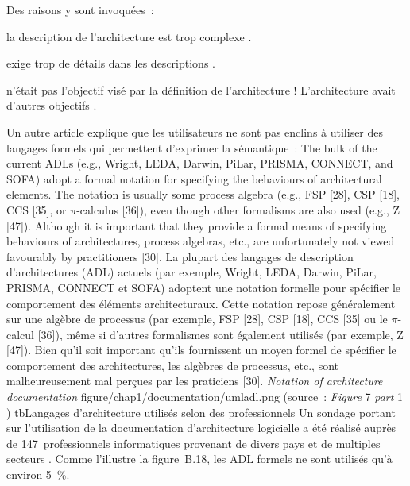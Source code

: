 {Des raisons y sont invoquées~:
 {
    \item[][---] \elide la description de l'architecture est trop complexe \elide.
    \item[][---]  exige trop de détails dans les descriptions \elide.
    \item[][---]  n'était pas l'objectif visé par la définition de l'architecture ! L'architecture avait d'autres objectifs \elide.
}{\cite{malavolta_what_2013}}

Un autre article explique que les utilisateurs ne sont pas enclins à utiliser des langages formels qui permettent d'exprimer la sémantique~:
\quoteenfr
{The bulk of the current ADLs (e.g., Wright, LEDA, Darwin, PiLar, PRISMA, CONNECT, and SOFA) adopt a formal notation for specifying the behaviours of architectural elements. The notation is usually some process algebra (e.g.,  FSP [28], CSP [18], CCS [35], or $\pi$-calculus [36]), even though other formalisms are also used (e.g., Z [47]). Although it is important that they provide a formal means of specifying behaviours of architectures, process algebras, etc., are unfortunately not viewed favourably by practitioners [30].}
{La plupart des langages de description d'architectures (ADL) actuels (par exemple, Wright, LEDA, Darwin, PiLar, PRISMA, CONNECT et SOFA) adoptent une notation formelle pour spécifier le comportement des éléments architecturaux. Cette notation repose généralement sur une algèbre de processus (par exemple, FSP [28], CSP [18], CCS [35] ou le $\pi$-calcul [36]), même si d'autres formalismes sont également utilisés (par exemple, Z [47]). Bien qu'il soit important qu'ils fournissent un moyen formel de spécifier le comportement des architectures, les algèbres de processus, etc., sont malheureusement mal perçues par les praticiens [30].}
{\cite{ozkaya_are_2013}}
\figsmallen
{\textit{Notation of architecture documentation}}
{figure/chap1/documentation/umladl.png}
{(source~: \textit{Figure} 7 \textit{part} 1 \cite{rost_software_2013})}
{}{}{tb}{Langages d'architecture utilisés selon des professionnels}
Un sondage portant sur l'utilisation de la documentation d'architecture logicielle a été réalisé auprès de 147~professionnels informatiques provenant de divers pays et de multiples secteurs \cite{rost_software_2013}. Comme l'illustre la figure~B.18, les ADL formels ne sont utilisés qu'à environ 5~\%.
}{}


